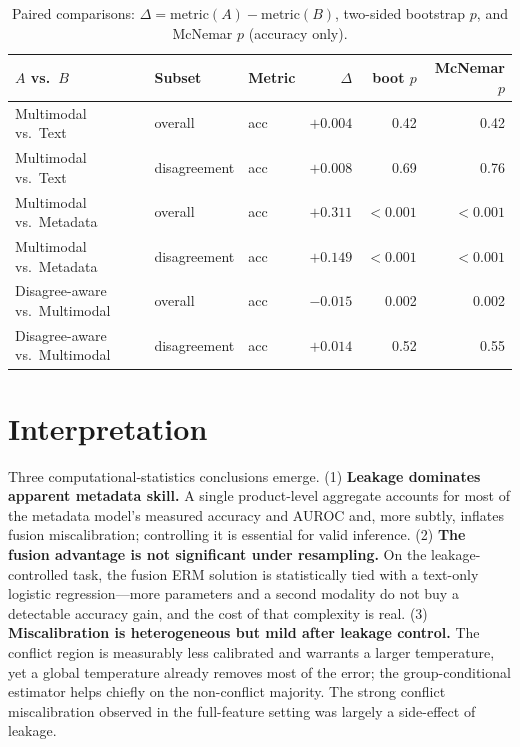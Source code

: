 \documentclass[11pt,a4paper]{article}
\begin{document}
\begin{table}[t]
\centering
\caption{Paired comparisons: $\Delta = \text{metric}(A)-\text{metric}(B)$,
two-sided bootstrap $p$, and McNemar $p$ (accuracy only).}
\label{tab:paired}
\begin{tabular}{lllrrr}
\toprule
$A$ vs.\ $B$ & Subset & Metric & $\Delta$ & boot $p$ & McNemar $p$ \\
\midrule
Multimodal vs.\ Text       & overall      & acc & $+0.004$ & 0.42 & 0.42 \\
Multimodal vs.\ Text       & disagreement & acc & $+0.008$ & 0.69 & 0.76 \\
Multimodal vs.\ Metadata   & overall      & acc & $+0.311$ & $<0.001$ & $<0.001$ \\
Multimodal vs.\ Metadata   & disagreement & acc & $+0.149$ & $<0.001$ & $<0.001$ \\
Disagree-aware vs.\ Multimodal & overall  & acc & $-0.015$ & 0.002 & 0.002 \\
Disagree-aware vs.\ Multimodal & disagreement & acc & $+0.014$ & 0.52 & 0.55 \\
\bottomrule
\end{tabular}
\end{table}

\section{Interpretation}
\label{sec:interpretation}

Three computational-statistics conclusions emerge. (1) \textbf{Leakage
dominates apparent metadata skill.} A single product-level aggregate accounts for
most of the metadata model's measured accuracy and AUROC and, more subtly,
inflates fusion miscalibration; controlling it is essential for valid inference.
(2) \textbf{The fusion advantage is not significant under resampling.} On the
leakage-controlled task, the fusion ERM solution is statistically tied with a
text-only logistic regression---more parameters and a second modality do not buy
a detectable accuracy gain, and the cost of that complexity is real.
(3) \textbf{Miscalibration is heterogeneous but mild after leakage control.} The
conflict region is measurably less calibrated and warrants a larger temperature,
yet a global temperature already removes most of the error; the
group-conditional estimator helps chiefly on the non-conflict majority. The
strong conflict miscalibration observed in the full-feature setting was largely a
side-effect of leakage.
\end{document}
